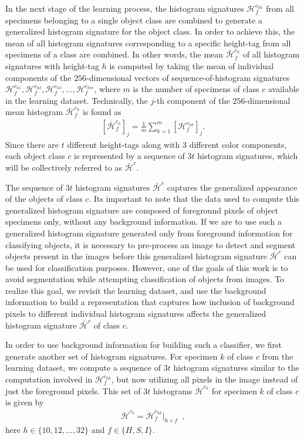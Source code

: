 In the next stage of the learning process, the histogram signatures $\mathcal{H}^{c_{hk}}_f$ from all specimens belonging to a single object class are combined to generate a generalized histogram signature for the object class.
In order to achieve this, the mean of all histogram signatures corresponding to a specific height-tag from all specimens of a class are combined. In other words, the mean $\bar{\mathcal{H}}^{c_{h}}_f$ of all histogram signatures with height-tag $h$ is computed by taking the mean of individual components of the $256$-dimensional vectors of sequence-of-histogram signatures $\mathcal{H}^{c_{h1}}_f, \mathcal{H}^{c_{h2}}_f, \mathcal{H}^{c_{h3}}_f, \ldots, \mathcal{H}^{c_{hm}}_f$, where $m$ is the number of specimens of class $c$ available in the learning dataset. Technically, the $j$-th component of the $256$-dimensional mean histogram $\bar{\mathcal{H}}^{c_{h}}_f$ is found as
\begin{align}
 \left[\bar{\mathcal{H}}^{c_{h}}_f\right]_j=\frac{1}{m}\sum_{k=1}^{m} \left[ \mathcal{H}^{c_{hk}}_f \right]_j.
\end{align}
Since there are $t$ different height-tags along with 3 different color components, each object class $c$ is represented by a sequence of $3t$ histogram signatures, which will be collectively referred to as $\bar{\mathcal{H}}^{c}$.

The sequence of $3t$ histogram signatures $\bar{\mathcal{H}}^{c}$ captures the generalized appearance of the objects of class $c$. Its important to note that the data used to compute this generalized histogram signature are composed of foreground pixels of object specimens only, without any background information. If we are to use such a generalized histogram signature generated only from foreground information for classifying objects, it is necessary to pre-process an image to detect and segment objects present in the images before this generalized histogram signature $\bar{\mathcal{H}}^{c}$ can be used for classification purposes. However, one of the goals of this work is to avoid segmentation while attempting classification of objects from images. To realize this goal, we revisit the learning dataset, and use the background information to build a representation that captures how inclusion of background pixels to different individual histogram signatures affects the generalized histogram signature $\bar{
\mathcal{H}}^{c}$ of class $c$. 

In order to use background information for building such a classifier, we first generate another set of histogram signatures.
For specimen $k$ of class $c$ from the learning dataset, we compute a sequence of $3t$ histogram signatures similar to the computation involved in $\mathcal{H}^{c_{hk}}_f$, but now utilizing all pixels in the image instead of just the foreground pixels. This set of $3t$ histograms $\ddot{\mathcal{H}}^{c_{k}}$ for specimen $k$ of class $c$ is given by
\begin{align}	\label{eqn:hist_signature}
 \ddot{\mathcal{H}}^{c_{k}} = \ddot{\mathcal{H}}^{c_{hk}}_f \Big|_{h\times f}\enspace ,
\end{align}
%
here $h\in\{10,12, \ldots,32\}$ and $f\in\{H,S,I\}$.


